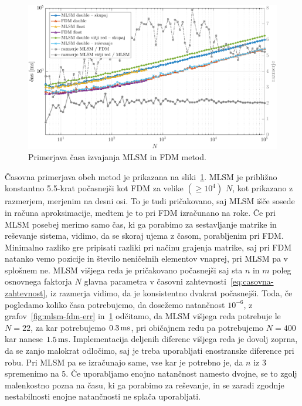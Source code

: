 \documentclass[12pt,a4paper,twoside]{article}
\theoremstyle{definition} %
\theoremstyle{plain} %
\numberwithin{equation}{section}
\newlength{\iw}
\begin{document}
\begin{figure}[h]
  \centering
  \includegraphics[width=\iw]{images/lap1d_times.pdf}
  \caption{Primerjava časa izvajanja MLSM in FDM metod.}
  \label{fig:mlsm-fdm-time}
\end{figure}

Časovna primerjava obeh metod je prikazana na sliki~\ref{fig:mlsm-fdm-time}.  MLSM je približno
konstantno 5.5-krat počasnejši kot FDM za velike $(\geq 10^4)$ $N$, kot prikazano z razmerjem,
merjenim na desni osi. To je tudi pričakovano, saj MLSM išče sosede in računa aproksimacije, medtem
je to pri FDM izračunano na roke.  Če pri MLSM posebej merimo samo čas, ki ga porabimo za
sestavljanje matrike in reševanje sistema, vidimo, da se skoraj ujema z časom, porabljenim pri FDM.
Minimalno razliko gre pripisati razliki pri načinu grajenja matrike, saj pri FDM natanko vemo
pozicije in število neničelnih elementov vnaprej, pri MLSM pa v splošnem ne. MLSM višjega reda je
pričakovano počasnejši saj sta $n$ in $m$ poleg osnovnega faktorja $N$ glavna parametra v časovni
zahtevnosti~\eqref{eq:casovna-zahtevnost}, iz razmerja vidimo, da je konsistentno dvakrat
počasnejši. Toda, če pogledamo koliko časa potrebujemo, da dosežemo natančnost $10^{-6}$, z
grafov~\ref{fig:mlsm-fdm-err} in~\ref{fig:mlsm-fdm-time} odčitamo, da MLSM višjega reda potrebuje le
$N = 22$, za kar potrebujemo $\unit[0.3]{ms}$, pri običajnem redu pa potrebujemo $N = 400$ kar
nanese $\unit[1.5]{ms}$. Implementacija deljenih diferenc višjega reda je dovolj zoprna, da se zanjo
malokrat odločimo, saj je treba uporabljati enostranske diference pri robu. Pri MLSM pa se
izračunajo same, vse kar je potrebno je, da $n$ iz 3 spremenimo na 5. Če uporabljamo enojno
natančnost namesto dvojne, se to zgolj malenkostno pozna na času, ki ga porabimo za reševanje, in
se zaradi zgodnje nestabilnosti enojne natančnosti ne splača uporabljati.
\end{document}
